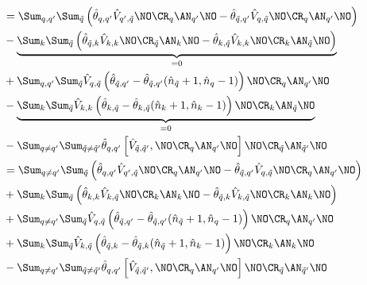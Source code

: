 \begin{appendix}
\begin{itemize}
\begin{align}
&=\Sum_{q, q^\prime}\Sum_{\tilde q} \left(\hat\theta_{q,q^\prime}\hat V_{q^\prime,\tilde q}\NO\CR_{q}\AN_{q^\prime}\NO-\hat\theta_{\tilde q,q^\prime}\hat V_{q,\tilde q}\NO\CR_{q}\AN_{q^\prime}\NO\right) \\
&-\underbrace{\Sum_{k}\Sum_{\tilde q} \left(\hat\theta_{\tilde q,k}\hat V_{k,k}\NO\CR_{\tilde q}\AN_k\NO-\hat\theta_{k,\tilde q}\hat V_{k,k}\NO\CR_{k}\AN_{\tilde q}\NO\right)}_{=0} \nonumber \\
&+\Sum_{q,q^\prime}\Sum_{\tilde q} \hat V_{q,\tilde q}\left(\hat\theta_{\tilde q,q^\prime}-\hat\theta_{\tilde q,q^\prime}(\hat n_{\tilde q}+1,\hat n_q-1)\right)\NO\CR_{q}\AN_{q^\prime}\NO\nonumber \\
&-\underbrace{\Sum_{k}\Sum_{\tilde q} \hat V_{k,k}\left(\hat\theta_{k,\tilde q}-\hat\theta_{k,\tilde q}(\hat n_{k}+1,\hat n_k-1)\right)\NO\CR_{k}\AN_{\tilde q}\NO}_{=0}\nonumber \\
&-\Sum_{q\neq q^\prime}\Sum_{\tilde q\neq\tilde q^\prime} \hat\theta_{q,q^\prime}\left[\hat V_{\tilde q,\tilde q^\prime},\NO\CR_q\AN_{q^\prime}\NO\right]\NO\CR_{\tilde q}\AN_{\tilde q^\prime}\NO\nonumber \\
&=\Sum_{q\neq q^\prime}\Sum_{\tilde q} \left(\hat\theta_{q,q^\prime}\hat V_{q^\prime,\tilde q}\NO\CR_{q}\AN_{q^\prime}\NO-\hat\theta_{\tilde q,q^\prime}\hat V_{q,\tilde q}\NO\CR_{q}\AN_{q^\prime}\NO\right) \\
&+\Sum_{k}\Sum_{\tilde q} \left(\hat\theta_{k,k}\hat V_{k,\tilde q}\NO\CR_{k}\AN_{k}\NO-\hat\theta_{\tilde q,k}\hat V_{k,\tilde q}\NO\CR_{k}\AN_{k}\NO\right) \nonumber \\
&+\Sum_{q\neq q^\prime}\Sum_{\tilde q} \hat V_{q,\tilde q}\left(\hat\theta_{\tilde q,q^\prime}-\hat\theta_{\tilde q,q^\prime}(\hat n_{\tilde q}+1,\hat n_q-1)\right)\NO\CR_{q}\AN_{q^\prime}\NO\nonumber \\
&+\Sum_{k}\Sum_{\tilde q} \hat V_{k,\tilde q}\left(\hat\theta_{\tilde q,k}-\hat\theta_{\tilde q,k}(\hat n_{\tilde q}+1,\hat n_k-1)\right)\NO\CR_{k}\AN_{k}\NO\nonumber \\
&-\Sum_{q\neq q^\prime}\Sum_{\tilde q\neq\tilde q^\prime} \hat\theta_{q,q^\prime}\left[\hat V_{\tilde q,\tilde q^\prime},\NO\CR_q\AN_{q^\prime}\NO\right]\NO\CR_{\tilde q}\AN_{\tilde q^\prime}\NO\nonumber \\

\end{align}
\end{itemize}
\end{appendix}
